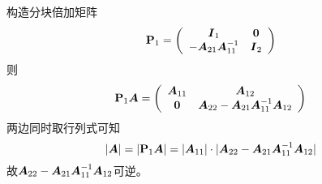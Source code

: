 \begin{frame}\ft{\secname}
\begin{jie}
  构造分块倍加矩阵
  $$
  \PP_1 = \left(
    \begin{array}{cc}
      \II_1 & \zero\\
      -\A_{21}\A_{11}^{-1} & \II_2
    \end{array}
  \right)
  $$
  则$$
  \PP_1\A = \left(
    \begin{array}{cc}
      \A_{11} & \A_{12} \\
      \zero & \A_{22}-\A_{21}\A_{11}^{-1}\A_{12}
    \end{array}
  \right)
  $$
  两边同时取行列式可知
  $$
  |\A| = |\PP_1\A| = |\A_{11}|\cdot |\A_{22}-\A_{21}\A_{11}^{-1}\A_{12}|
  $$
  故$\A_{22}-\A_{21}\A_{11}^{-1}\A_{12}$可逆。
\end{jie}
\end{frame}

